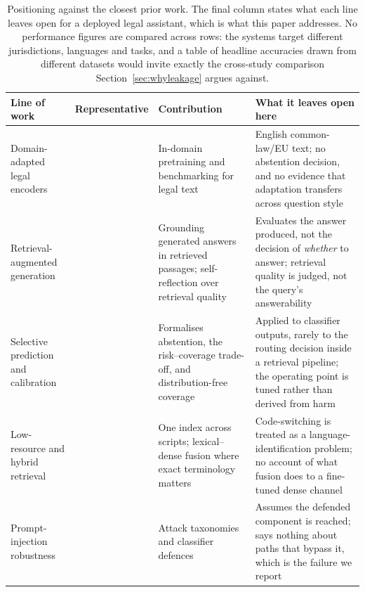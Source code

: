 \documentclass[conference]{IEEEtran}
\begin{document}
\begin{table}[t]
\caption{Positioning against the closest prior work. The final column states
what each line leaves open for a deployed legal assistant, which is what this
paper addresses. No performance figures are compared across rows: the systems
target different jurisdictions, languages and tasks, and a table of headline
accuracies drawn from different datasets would invite exactly the
cross-study comparison Section~\ref{sec:whyleakage} argues against.}
\label{tab:related}
\centering
\small
\begin{tabular}{@{}p{}p{}p{}p{}@{}}
\toprule
Line of work & Representative & Contribution & What it leaves open here \\
\midrule
Domain-adapted legal encoders &
\cite{chalkidis2020legalbert,guha2023legalbench} &
In-domain pretraining and benchmarking for legal text &
English common-law/EU text; no abstention decision, and no evidence that
adaptation transfers across question style \\

Retrieval-augmented generation &
\cite{lewis2020rag,karpukhin2020dpr,asai2024selfrag} &
Grounding generated answers in retrieved passages; self-reflection over
retrieval quality &
Evaluates the answer produced, not the decision of \emph{whether} to answer;
retrieval quality is judged, not the query's answerability \\

Selective prediction and calibration &
\cite{elyaniv2010selective,geifman2017selectivenet,guo2017calibration,angelopoulos2021conformal} &
Formalises abstention, the risk--coverage trade-off, and distribution-free
coverage &
Applied to classifier outputs, rarely to the routing decision inside a
retrieval pipeline; the operating point is tuned rather than derived from harm \\

Low-resource and hybrid retrieval &
\cite{wang2024multilinguale5,robertson2009bm25,cormack2009rrf} &
One index across scripts; lexical--dense fusion where exact terminology matters &
Code-switching is treated as a language-identification problem; no account of
what fusion does to a fine-tuned dense channel \\

Prompt-injection robustness &
\cite{perez2022ignore,greshake2023injection} &
Attack taxonomies and classifier defences &
Assumes the defended component is reached; says nothing about paths that
bypass it, which is the failure we report \\
\bottomrule
\end{tabular}
\end{table}
\end{document}
